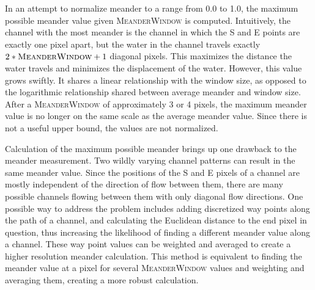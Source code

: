In an attempt to normalize meander to a range from 0.0 to 1.0, the maximum possible meander value given \textsc{MeanderWindow} is computed. Intuitively, the channel with the most meander is the channel in which the S and E points are exactly one pixel apart, but the water in the channel travels exactly $2 * \textsc{MeanderWindow} + 1$ diagonal pixels. This maximizes the distance the water travels and minimizes the displacement of the water. However,
this value grows swiftly. It shares a linear relationship with the window size, as opposed to the logarithmic relationship shared between average meander and window size. After a \textsc{MeanderWindow} of approximately 3 or 4 pixels, the maximum meander value is no longer on the same scale as the average meander value. Since there is not a useful upper bound, the values are not normalized.

Calculation of the maximum possible meander brings up one drawback to the meander measurement. Two wildly varying channel patterns can result in the same meander value. Since the positions of the S and E pixels of a channel are mostly independent of the direction of flow between them, there are many possible channels flowing between them with only diagonal flow directions. 
One possible way to address the problem includes adding discretized way points along the path of a channel, and calculating the Euclidean distance to the end pixel in question, thus increasing the likelihood of finding a different meander value along a channel. These way point values can be weighted and averaged to create a higher resolution meander calculation. This method is equivalent to finding the meander value at a pixel for several \textsc{MeanderWindow} values and weighting and averaging them, creating a more robust calculation.


